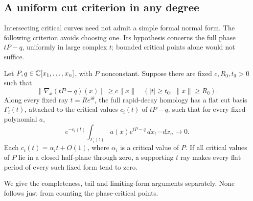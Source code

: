 \subsection{A uniform cut criterion in any degree}
\label{sec:uniformcutdecay}

Intersecting critical curves need not admit a simple formal normal
form. The following criterion avoids choosing one. Its hypothesis
concerns the full phase $tP-q$, uniformly in large complex $t$;
bounded critical points alone would not suffice.

\begin{theorem}\label{thm:uniformcuts}
Let $P,q\in\mathbb C[x_1,\ldots,x_n]$, with $P$ nonconstant. Suppose
there are fixed $c,R_0,t_0>0$ such that
\begin{equation}\label{eq:uniformphasegradient}
 \|\nabla_x(tP-q)(x)\|\ge c\|x\|
       \quad(|t|\ge t_0,\ \|x\|\ge R_0).
\end{equation}
Along every fixed ray $t=Re^{i\theta}$, the full rapid-decay
homology has a flat cut basis $\Gamma_i(t)$, attached to the
critical values $c_i(t)$ of $tP-q$, such that for every fixed
polynomial $a$,
\begin{equation}\label{eq:normalizedcutdecay}
 e^{-c_i(t)}\int_{\Gamma_i(t)}a(x)e^{tP-q}\,
                 dx_1\cdots dx_n\longrightarrow0.
\end{equation}
Each $c_i(t)=\alpha_i t+O(1)$, where $\alpha_i$ is a critical
value of $P$. If all critical values of $P$ lie in a closed
half-plane through zero, a supporting $t$ ray makes every flat
period of every such fixed form tend to zero.
\end{theorem}

We give the completeness, tail and limiting-form arguments separately.
None follows just from counting the phase-critical points.

